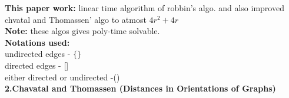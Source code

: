 \documentclass{article}
\begin{document}
{\vspace{1cm}
  \textbf{This paper work:} linear time algorithm of robbin's algo. and also improved chvatal and Thomassen' algo to atmost
   $4r^{2}+4r$ \\
\textbf{Note:} these algos
gives poly-time solvable. \\
   
\vspace{2cm} 
\textbf{Notations used:}\\
undirected edges - $\lbrace\rbrace$ \\
directed edges - []\\
either directed or undirected -()\\
\newpage
\textbf{2.Chavatal and Thomassen (Distances in Orientations of Graphs)}

































}
\end{document}
